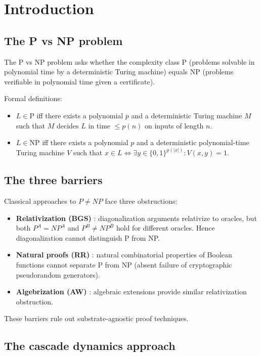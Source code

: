 \documentclass[11pt, a4paper]{amsart}
\theoremstyle{definition}
\begin{document}
\section{Introduction}

\subsection{The P vs NP problem}

The P vs NP problem asks whether the complexity class P (problems
solvable in polynomial time by a deterministic Turing machine) equals
NP (problems verifiable in polynomial time given a certificate).

Formal definitions:
\begin{itemize}
\item $L \in \mathrm{P}$ iff there exists a polynomial $p$ and a
    deterministic Turing machine $M$ such that $M$ decides $L$ in
    time $\leq p(n)$ on inputs of length $n$.
\item $L \in \mathrm{NP}$ iff there exists a polynomial $p$ and a
    deterministic polynomial-time Turing machine $V$ such that
    $x \in L \iff \exists y \in \{0,1\}^{p(|x|)}: V(x, y) = 1$.
\end{itemize}

\subsection{The three barriers}

Classical approaches to $P \neq NP$ face three obstructions:

\begin{itemize}
\item \textbf{Relativization (BGS)} \cite{BGS1975}: diagonalization
    arguments relativize to oracles, but both $P^A = NP^A$ and
    $P^B \neq NP^B$ hold for different oracles. Hence diagonalization
    cannot distinguish P from NP.
\item \textbf{Natural proofs (RR)} \cite{RR1994}: natural combinatorial
    properties of Boolean functions cannot separate P from NP (absent
    failure of cryptographic pseudorandom generators).
\item \textbf{Algebrization (AW)} \cite{AW2008}: algebraic extensions
    provide similar relativization obstruction.
\end{itemize}

These barriers rule out substrate-agnostic proof techniques.

\subsection{The cascade dynamics approach}
\end{document}
